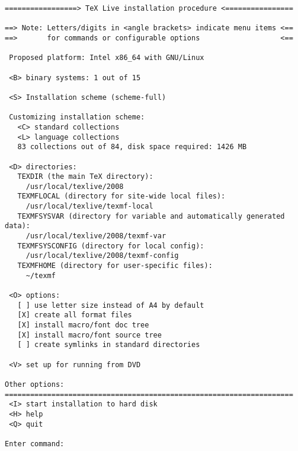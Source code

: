 \documentclass{article}
\begin{document}
\tiny
\begin{verbatim}
=================> TeX Live installation procedure <================

==> Note: Letters/digits in <angle brackets> indicate menu items <==
==>       for commands or configurable options                   <==

 Proposed platform: Intel x86_64 with GNU/Linux
 
 <B> binary systems: 1 out of 15

 <S> Installation scheme (scheme-full)

 Customizing installation scheme:
   <C> standard collections
   <L> language collections
   83 collections out of 84, disk space required: 1426 MB

 <D> directories:
   TEXDIR (the main TeX directory):
     /usr/local/texlive/2008
   TEXMFLOCAL (directory for site-wide local files):
     /usr/local/texlive/texmf-local
   TEXMFSYSVAR (directory for variable and automatically generated data):
     /usr/local/texlive/2008/texmf-var
   TEXMFSYSCONFIG (directory for local config):
     /usr/local/texlive/2008/texmf-config
   TEXMFHOME (directory for user-specific files):
     ~/texmf

 <O> options:
   [ ] use letter size instead of A4 by default
   [X] create all format files
   [X] install macro/font doc tree
   [X] install macro/font source tree
   [ ] create symlinks in standard directories

 <V> set up for running from DVD

Other options:
====================================================================
 <I> start installation to hard disk
 <H> help
 <Q> quit

Enter command:  
\end{verbatim}
\end{document}
